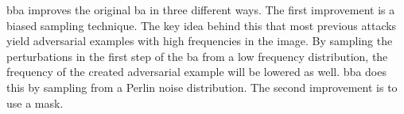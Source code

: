 \gls{bba} \cite{brunner_guessing_2019} improves the original \gls{ba} in three different ways. The first improvement is a biased sampling technique. The key idea behind this that most previous attacks yield adversarial examples with high frequencies in the image. By sampling the perturbations in the first step of the \gls{ba} from a low frequency distribution, the frequency of the created adversarial example will be lowered as well. \gls{bba} does this by sampling from a Perlin noise \cite{perlin} distribution. The second improvement is to use a mask. \\

\begin{figure}
\centering
{} %
\begin{tikzpicture}[x=0.75pt,y=0.75pt,yscale=-1,xscale=1]


\end{tikzpicture}
\end{figure}
